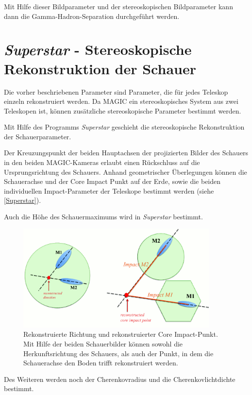 Mit Hilfe dieser Bildparameter und der stereoskopischen Bildparameter kann dann die Gamma-Hadron-Separation durchgeführt werden.


\section{\textit{Superstar} - Stereoskopische Rekonstruktion der Schauer}
\label{sec:Superstar}
Die vorher beschriebenen Parameter sind Parameter, die für jedes Teleskop einzeln rekonstruiert werden. 
Da MAGIC ein stereoskopisches System aus zwei Teleskopen ist, können zusätzliche stereoskopische Parameter bestimmt werden.

Mit Hilfe des Programms \textit{Superstar} geschieht die stereoskopische Rekonstruktion der Schauerparameter.

Der Kreuzungspunkt der beiden Hauptachsen der projizierten Bilder des Schauers in den beiden MAGIC-Kameras erlaubt einen Rückschluss auf die Ursprungsrichtung des Schauers.
Anhand geometrischer Überlegungen können die Schauerachse und der Core Impact Punkt auf der Erde, sowie die beiden individuellen Impact-Parameter der Teleskope bestimmt werden (siehe \autoref{Superstar}).\cite{Superstar}

Auch die Höhe des Schauermaximums wird in \textit{Superstar} bestimmt.

\begin{figure}
    \centering
    \includegraphics[width=0.9\textwidth]{./Plots/03_MonteCarlos/Superstar.png}
    \caption{Rekonstruierte Richtung und rekonstruierter Core Impact-Punkt.
    Mit Hilfe der beiden Schauerbilder können sowohl die Herkunftsrichtung des Schauers, als auch der Punkt, in dem die Schauerachse den Boden trifft rekonstruiert werden.\cite{Superstar}}
    \label{Superstar}
\end{figure}

Des Weiteren werden noch der Cherenkovradius und die Cherenkovlichtdichte bestimmt.\cite{Superstar}

